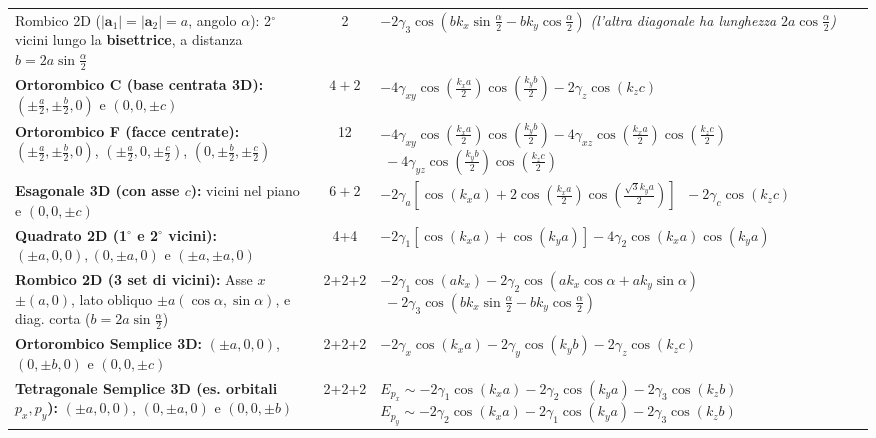 \begin{center}
{\begin{tabular}{p{6.2cm} c p{8.4cm}}
Rombico 2D ($|\mathbf{a}_1|=|\mathbf{a}_2|=a$, angolo $\alpha$): 2$^\circ$ vicini lungo la \textbf{bisettrice}, a distanza $b=2a\sin\frac{\alpha}{2}$ & 2 & $-2\gamma_3\cos\!\left(b k_x\sin\frac{\alpha}{2} - b k_y\cos\frac{\alpha}{2}\right)$ \newline \textit{(l'altra diagonale ha lunghezza $2a\cos\frac{\alpha}{2}$)} \\
\textbf{Ortorombico C (base centrata 3D):} \newline $\left(\pm\frac a2,\pm\frac b2,0\right)$ e $(0,0,\pm c)$ & $4+2$ & $-4\gamma_{xy}\cos\!\left(\frac{k_xa}{2}\right)\cos\!\left(\frac{k_yb}{2}\right) - 2\gamma_z\cos(k_zc)$ \\
\textbf{Ortorombico F (facce centrate):} \newline $\left(\pm\frac a2,\pm\frac b2,0\right)$, $\left(\pm\frac a2,0,\pm\frac c2\right)$, $\left(0,\pm\frac b2,\pm\frac c2\right)$ & 12 & $-4\gamma_{xy}\cos\!\left(\frac{k_xa}{2}\right)\cos\!\left(\frac{k_yb}{2}\right) - 4\gamma_{xz}\cos\!\left(\frac{k_xa}{2}\right)\cos\!\left(\frac{k_zc}{2}\right)$ \newline $\;- 4\gamma_{yz}\cos\!\left(\frac{k_yb}{2}\right)\cos\!\left(\frac{k_zc}{2}\right)$ \\
\textbf{Esagonale 3D (con asse $c$):} \newline 6 vicini nel piano e $(0,0,\pm c)$ & $6+2$ & $-2\gamma_a\left[\cos(k_xa)+2\cos\!\left(\frac{k_xa}{2}\right)\cos\!\left(\frac{\sqrt3 k_ya}{2}\right)\right]$ \newline $\;- 2\gamma_c\cos(k_zc)$ \\
\textbf{Quadrato 2D (1$^\circ$ e 2$^\circ$ vicini):} \newline $(\pm a,0,0),(0,\pm a,0)$ e $(\pm a,\pm a,0)$ & 4+4 & $-2\gamma_1[\cos(k_xa)+\cos(k_ya)] - 4\gamma_2\cos(k_xa)\cos(k_ya)$ \\
\textbf{Rombico 2D (3 set di vicini):} \newline Asse $x$ $\pm(a,0)$, lato obliquo $\pm a(\cos\alpha, \sin\alpha)$, \newline e diag. corta ($b=2a\sin\frac{\alpha}{2}$) & 2+2+2 & $-2\gamma_1\cos(a k_x) - 2\gamma_2\cos(a k_x\cos\alpha + a k_y\sin\alpha)$ \newline $\;- 2\gamma_3\cos\left(b k_x\sin\frac{\alpha}{2} - b k_y\cos\frac{\alpha}{2}\right)$ \\
\textbf{Ortorombico Semplice 3D:} \newline $(\pm a,0,0)$, $(0,\pm b,0)$ e $(0,0,\pm c)$ & 2+2+2 & $-2\gamma_x\cos(k_xa) - 2\gamma_y\cos(k_yb) - 2\gamma_z\cos(k_zc)$ \\
\textbf{Tetragonale Semplice 3D (es. orbitali $p_x, p_y$):} \newline $(\pm a,0,0)$, $(0,\pm a,0)$ e $(0,0,\pm b)$ & 2+2+2 & $E_{p_x} \sim -2\gamma_1\cos(k_xa) - 2\gamma_2\cos(k_ya) - 2\gamma_3\cos(k_zb)$ \newline $E_{p_y} \sim -2\gamma_2\cos(k_xa) - 2\gamma_1\cos(k_ya) - 2\gamma_3\cos(k_zb)$ \\
\bottomrule
\end{tabular}}
\end{center}

